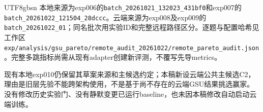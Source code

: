 \documentclass[sigconf,anonymous,review]{acmart}
\begin{document}
\begin{CJK*}{UTF8}{gbsn}
本地来源为exp006的\nolinkurl{batch_20261021_132023_431bf0}和exp007的\nolinkurl{batch_20261022_121504_28dccc}。云端来源为exp008及exp009的\nolinkurl{batch_20261022_01}；同名批次用实验ID和完整远程路径区分。逐题与配置哈希见工作区\nolinkurl{exp/analysis/gsu_pareto/remote_audit_20261022/remote_pareto_audit.json}。完整多跳指标尚需从现有adapter创建新评测，不覆写先导metrics。

现有本地exp010仍保留其草案来源和主候选约定；本稿新设云端公共主候选C2，理由是旧层先验不能跨架构使用，不是基于尚不存在的云端GSU结果挑选赢家。没有修改历史实验门、没有静默变更已运行baseline，也未因本稿修改自动启动云端训练。
\clearpage
\end{CJK*}
\end{document}
